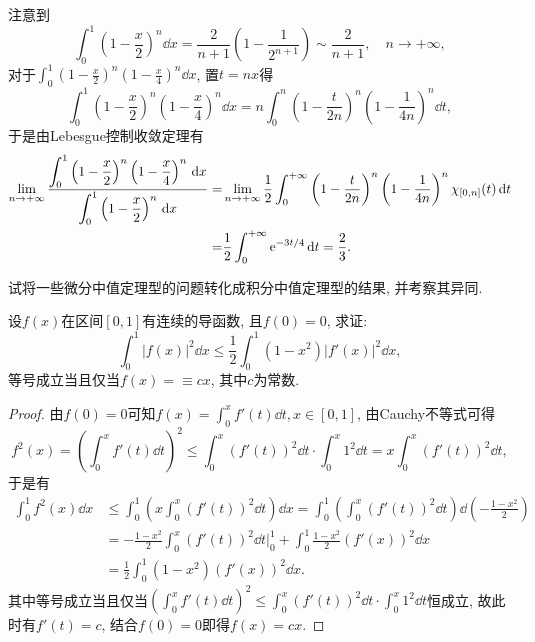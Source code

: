 \begin{quizb}
\begin{solution}
注意到\[\int_{0}^{1}\left(1-\frac{x}{2}\right)^n\dd x=\frac{2}{n+1}\left(1-\frac{1}{2^{n+1}}\right)\sim\frac{2}{n+1},\quad n\rightarrow+\infty,\]
对于\(\int_{0}^{1}\left(1-\frac{x}{2}\right)^n\left(1-\frac{x}{4}\right)^n\dd x\), 置\(t=nx\)得\[\int_{0}^{1}\left(1-\frac{x}{2}\right)^n\left(1-\frac{x}{4}\right)^n\dd x=n\int_{0}^{n}\left(1-\frac{t}{2n}\right)^n\left(1-\frac{1}{4n}\right)^n\dd t,\]
于是由Lebesgue控制收敛定理有\[\begin{split}
\lim_{n\rightarrow+\infty}\frac{\displaystyle\int_{0}^{1}\left(1-\frac{x}{2}\right)^n\left(1-\frac{x}{4}\right)^n\,\mathrm{d} x}{\displaystyle\int_{0}^{1}\left(1-\frac{x}{2}\right)^n\,\mathrm{d} x}=&\lim_{n\rightarrow+\infty}\frac{1}{2}\int_{0}^{+\infty}\left(1-\frac{t}{2n}\right)^n\left(1-\frac{1}{4n}\right)^n\chi_{[0,n]}(t)\,\mathrm{d} t\\=&\frac{1}{2}\int_{0}^{+\infty}\mathrm{e}^{-3t/4}\,\mathrm{d} t=\frac{2}{3}.\qedhere
\end{split}\]
\end{solution}
\woe 试将一些微分中值定理型的问题转化成积分中值定理型的结果, 并考察其异同.
\end{quizb}
设\(f(x)\)在区间\([0,1]\)有连续的导函数, 且\(f(0)=0\), 求证:\[\int_{0}^{1}|f(x)|^2\dd x\leqslant\frac{1}{2}\int_{0}^{1}(1-x^2)|f'(x)|^2\dd x,\]等号成立当且仅当\(f(x)=\equiv cx\), 其中\(c\)为常数.
\begin{proof}
由\(f(0)=0\)可知\(f(x)=\int_{0}^{x}f'(t)\dd t,x\in[0,1]\), 由Cauchy不等式可得\[f^2(x)=\left(\int_{0}^{x}f'(t)\dd t\right)^2\leqslant \int_{0}^{x}\left(f'(t)\right)^2\dd t\cdot\int_{0}^{x}1^2\dd t=x\int_{0}^{x}\left(f'(t)\right)^2\dd t,\]
于是有\[\begin{split}
\int_{0}^{1}f^2(x)\dd x&\leqslant\int_{0}^{1}\left(x\int_{0}^{x}\left(f'(t)\right)^2\dd t\right)\dd x=\int_{0}^{1}\left(\int_{0}^{x}\left(f'(t)\right)^2\dd t\right)\dd\left(-\frac{1-x^2}{2}\right)\\
&=-\frac{1-x^2}{2}\int_{0}^{x}\left(f'(t)\right)^2\dd t\Big|_0^1+\int_{0}^{1}\frac{1-x^2}{2}\left(f'(x)\right)^2\dd x\\&=\frac{1}{2}\int_{0}^{1}(1-x^2)\left(f'(x)\right)^2\dd x.
\end{split}\]
其中等号成立当且仅当\(\left(\int_{0}^{x}f'(t)\dd t\right)^2\leqslant \int_{0}^{x}\left(f'(t)\right)^2\dd t\cdot\int_{0}^{x}1^2\dd t\)恒成立, 故此时有\(f'(t)=c\), 结合\(f(0)=0\)即得\(f(x)=cx\).
\end{proof}
